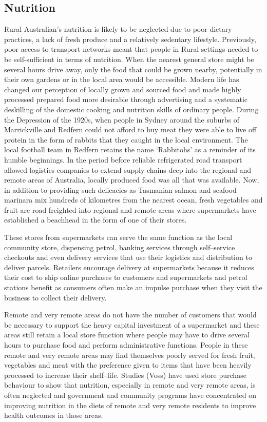\subsection{Nutrition}
Rural Australian's nutrition is likely to be neglected due to poor dietary practices, a lack of fresh produce and a relatively sedentary lifestyle.  Previously, poor access to transport networks meant that people in Rural settings needed to be self-sufficient in terms of nutrition. When the nearest general store might be several hours drive away, only the food that could be grown nearby, potentially in their own gardens or in the local area would be accessible. Modern life has changed our perception of locally grown and sourced food and made highly processed prepared food more desirable through advertising and a systematic deskilling of the domestic cooking and nutrition skills of ordinary people. During the Depression of the 1920s, when people in Sydney around the suburbs of Marrickville and Redfern could not afford to buy meat they were able to live off protein in the form of rabbits that they caught in the local environment. The local football team in Redfern retains the name `Rabbitohs' as a reminder of its humble beginnings. In the period before reliable refrigerated road transport allowed logistics companies to extend supply chains deep into the regional and remote areas of Australia, locally produced food was all that was available. Now, in addition to providing such delicacies as Tasmanian salmon and seafood marinara mix hundreds of kilometres from the nearest ocean, fresh vegetables and fruit are road freighted into regional and remote areas where supermarkets have established a beachhead in the form of one of their stores.

These stores from supermarkets can serve the same function as the local community store, dispensing petrol, banking services through self--service checkouts and even delivery services that use their logistics and distribution to deliver parcels\cite[p22]{KPMG2014}. Retailers encourage delivery at supermarkets because it reduces their cost to ship online purchases to customers and supermarkets and petrol stations benefit as consumers often make an impulse purchase when they visit the business to collect their delivery\cite{FMCG2017}.

Remote and very remote areas do not have the number of customers that would be necessary to support the heavy capital investment of a supermarket and these areas still retain a local store function where people may have to drive several hours to purchase food and perform administrative functions. People in these remote and very remote areas may find themselves poorly served for fresh fruit, vegetables and meat with the preference given to items that have been heavily processed to increase their shelf--life. Studies (Voss) have used store purchase behaviour to show that nutrition, especially in remote and very remote areas, is often neglected and government and community programs have concentrated on improving nutrition in the diets of remote and very remote residents to improve health outcomes in those areas.

